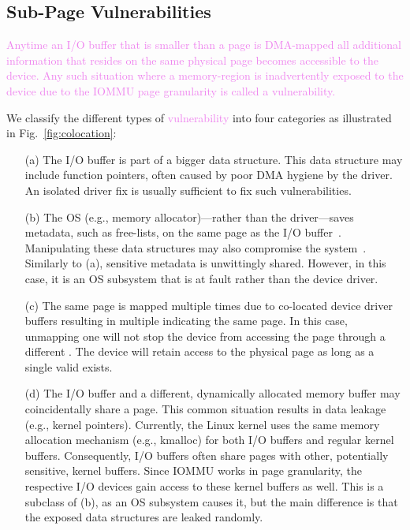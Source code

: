 \subsection{Sub-Page Vulnerabilities}\label{sec:subpage}

\textcolor{violet}{Anytime an I/O buffer that is smaller than a page is DMA-mapped all additional information that resides on the same physical page becomes accessible to the device. Any such situation where a memory-region is inadvertently exposed to the device due to the IOMMU page granularity is called a \subpage vulnerability.}

We classify the different types of \textcolor{violet}{\subpage vulnerability} into four categories as illustrated in Fig.~\ref{fig:colocation}:

\begin{enumerate}
    \item[(a)] The I/O buffer is part of a bigger data structure. This data structure may include function pointers, often caused by poor DMA hygiene by the driver. An isolated driver fix is usually sufficient to fix such vulnerabilities.
    \item[(b)] The OS (e.g., memory allocator)---rather than the driver---saves metadata, such as free-lists, on the same page as the I/O buffer~\cite{Cor07}. Manipulating these data structures may also compromise the system~\cite{ak09}. Similarly to (a), sensitive metadata is unwittingly shared. However, in this case, it is an OS subsystem that is at fault rather than the device driver.
    \item[(c)] The same page is mapped multiple times due to co-located device driver buffers resulting in multiple \iova{} indicating the same page. 
    In this case, unmapping one \iova will not stop the device from accessing the page through a different \iova.
    The device will retain access to the physical page as long as a single valid \iova{} exists.
    \item[(d)] The I/O buffer and a different, dynamically allocated memory buffer may coincidentally share a page. This common situation results in data leakage (e.g., kernel pointers). Currently, the Linux kernel uses the same memory allocation mechanism (e.g., kmalloc) for both I/O buffers and regular kernel buffers. Consequently, I/O buffers often share pages with other, potentially sensitive, kernel buffers. Since IOMMU works in page granularity, the respective I/O devices gain access to these kernel buffers as well. This is a subclass of (b), as an OS subsystem causes it, but the main difference is that the exposed data structures are leaked randomly.

\end{enumerate}

